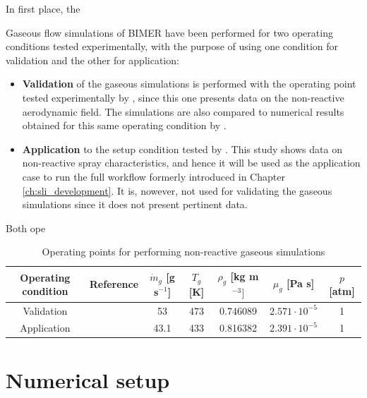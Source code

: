 In first place, the 

Gaseous flow simulations of BIMER have been performed for two operating conditions tested experimentally, with the purpose of using one condition for validation and the other for application:

\begin{itemize}

	\item \textbf{Validation} of the gaseous simulations is performed with the operating point tested experimentally by , since this one presents data on the non-reactive aerodynamic field. The simulations are also compared to numerical results obtained for this same operating condition by . 
	
	\item \textbf{Application} to the setup condition tested by . This study shows data on non-reactive spray characteristics, and hence it will be used as the application case to run the full workflow formerly introduced in Chapter \ref{ch:sli_development}. It is, nowever, not used for validating the gaseous simulations since it does not present pertinent data.

\end{itemize}

Both ope

\begin{table}[!h]
\centering
\caption{Operating points for performing non-reactive gaseous simulations}
\begin{tabular}{|c|c|c|c|c|c|c|}
\hline
Operating condition   &  Reference & $\dot{m}_g$ [g s$^{-1}$] & $T_g$ [K] & $\rho_g$ [kg m$^{-3}]$  & $\mu_g$ [Pa s] & $p$ [atm]  \\
\hline
\hline
Validation &   & 53 & 473 & 0.746089 & $2.571 \cdot 10^{-5}$ & 1 \\
\hline
Application &  & 43.1 & 433 & 0.816382 & $2.391 \cdot 10^{-5}$ & 1 \\
\hline
\end{tabular}
\label{tab:gaseous_operating_points_BIMER}
\end{table}



\section{Numerical setup}


